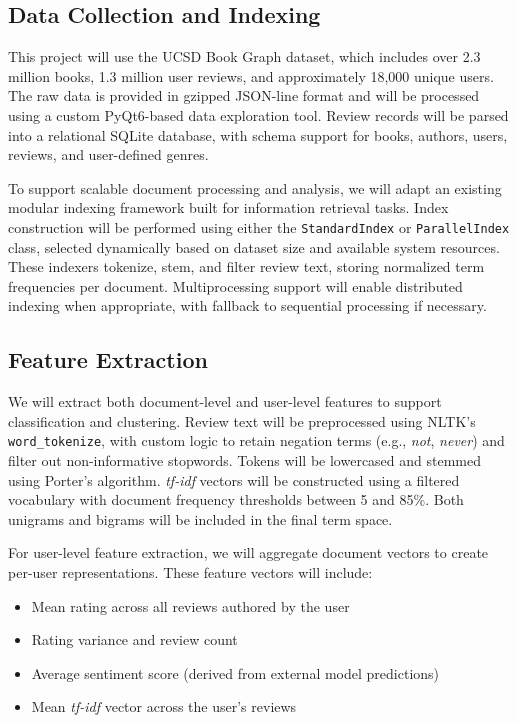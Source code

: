 \subsection{Data Collection and Indexing}
This project will use the UCSD Book Graph dataset, which includes over 2.3 million books, 1.3 million user reviews, and approximately 18,000 unique users. The raw data is provided in gzipped JSON-line format and will be processed using a custom PyQt6-based data exploration tool. Review records will be parsed into a relational SQLite database, with schema support for books, authors, users, reviews, and user-defined genres. 

To support scalable document processing and analysis, we will adapt an existing modular indexing framework built for information retrieval tasks. Index construction will be performed using either the \texttt{StandardIndex} or \texttt{ParallelIndex} class, selected dynamically based on dataset size and available system resources. These indexers tokenize, stem, and filter review text, storing normalized term frequencies per document. Multiprocessing support will enable distributed indexing when appropriate, with fallback to sequential processing if necessary.

\subsection{Feature Extraction}
We will extract both document-level and user-level features to support classification and clustering. Review text will be preprocessed using NLTK’s \texttt{word\_tokenize}, with custom logic to retain negation terms (e.g., \textit{not}, \textit{never}) and filter out non-informative stopwords. Tokens will be lowercased and stemmed using Porter’s algorithm. \textit{tf-idf} vectors will be constructed using a filtered vocabulary with document frequency thresholds between 5 and 85\%. Both unigrams and bigrams will be included in the final term space.

For user-level feature extraction, we will aggregate document vectors to create per-user representations. These feature vectors will include:
\begin{itemize}
  \item Mean rating across all reviews authored by the user
  \item Rating variance and review count
  \item Average sentiment score (derived from external model predictions)
  \item Mean \textit{tf-idf} vector across the user’s reviews
\end{itemize}

